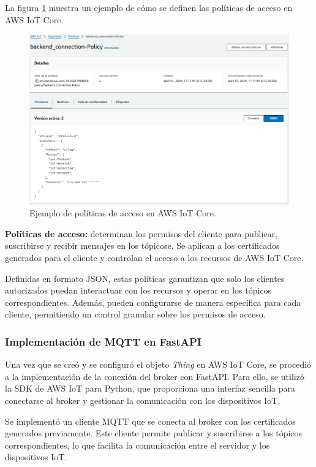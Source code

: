 La figura \ref{fig:aws_iot_policies} muestra un ejemplo de cómo se definen las
políticas de acceso en AWS IoT Core.
\begin{figure}[H]
    \centering
    \includegraphics[width=.99\textwidth]{./Images/18.png}
    \caption{Ejemplo de políticas de acceso en AWS IoT Core.}
    \label{fig:aws_iot_policies}
\end{figure}

\textbf{Políticas de acceso:} determinan los permisos del cliente para publicar,
suscribirse y recibir mensajes en los tópicose. Se aplican a los certificados
generados para el cliente y controlan el acceso a los recursos de AWS IoT Core.

Definidas en formato JSON, estas políticas garantizan que solo los clientes
autorizados puedan interactuar con los recursos y operar en los tópicos
correspondientes. Además, pueden configurarse de manera específica para cada
cliente, permitiendo un control granular sobre los permisos de acceso.

\subsubsection{Implementación de MQTT en FastAPI}
Una vez que se creó y se configuró el objeto \textit{Thing} en AWS IoT Core, se
procedió a la implementación de la conexión del broker con FastAPI. Para ello,
se utilizó la SDK de AWS IoT para Python, que proporciona una interfaz sencilla
para conectarse al broker y gestionar la comunicación con los dispositivos IoT.

Se implementó un cliente MQTT que se conecta al broker con los certificados
generados previamente. Este cliente permite publicar y suscribirse a los
tópicos correspondientes, lo que facilita la comunicación entre el servidor y
los dispositivos IoT.

